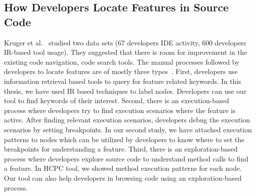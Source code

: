 \subsection{How Developers Locate Features in Source Code}
\label{related:feature_locate}
Kruger et al.~\cite{kruger2019features} studied two data sets (67 developers IDE activity, 600 developers IR-based tool usage). They suggested that there is room for improvement in the existing code navigation, code search tools. The manual processes followed by developers to locate features are of mostly three types~\cite{damevski2016field, wang2011exploratory, revelle2005understanding}. First, developers use information retrieval based tools to query for feature related keywords. In this thesis, we have used IR based techniques to label nodes. Developers can use our tool to find keywords of their interest. Second, there is an  execution-based process where developers try to find execution scenarios where the feature is active. After finding relevant execution scenarios, developers debug the execution scenarios by setting breakpoints. In our second study, we have attached execution patterns to nodes which can be utilized by developers to know where to set the breakpoints for understanding a feature. Third, there is an exploration-based process where developers explore source code to understand method calls to find a feature. In HCPC tool, we showed method execution patterns for each node. Our tool can also help developers in browsing code using an  exploration-based process.







